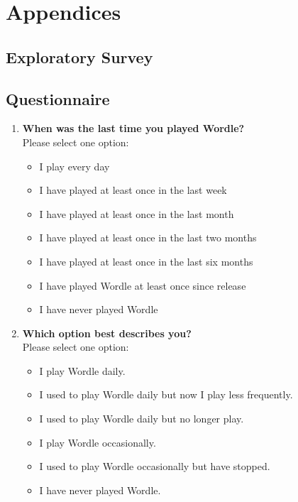 \chapter{Appendices}
\section{Exploratory Survey}

\section*{Questionnaire}

\begin{enumerate}

    \item \textbf{When was the last time you played Wordle?} \\
    Please select one option:
    \begin{itemize}
        \item I play every day
        \item I have played at least once in the last week
        \item I have played at least once in the last month
        \item I have played at least once in the last two months
        \item I have played at least once in the last six months
        \item I have played Wordle at least once since release
        \item I have never played Wordle
    \end{itemize}

    \item \textbf{Which option best describes you?} \\
    Please select one option:
    \begin{itemize}
        \item I play Wordle daily.
        \item I used to play Wordle daily but now I play less frequently.
        \item I used to play Wordle daily but no longer play.
        \item I play Wordle occasionally.
        \item I used to play Wordle occasionally but have stopped.
        \item I have never played Wordle.
    \end{itemize}


\end{enumerate}
